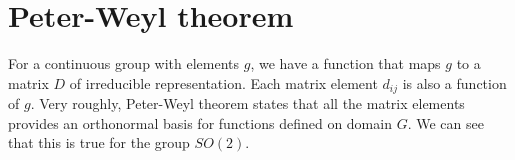 \documentclass{amsart}
\theoremstyle{remark}
\theoremstyle{remark}
\theoremstyle{definition}
\begin{document}
\section*{Peter-Weyl theorem}
For a continuous group with elements $g$, we have a function that maps $g$ to a matrix $D$ of irreducible 
representation. Each matrix element $d_{ij}$ is also a function of $g$. 
Very roughly, Peter-Weyl theorem states that all the matrix elements provides an orthonormal basis 
for functions defined on domain $G$.
We can see that this is true for the group $SO(2)$. 
\end{document}
